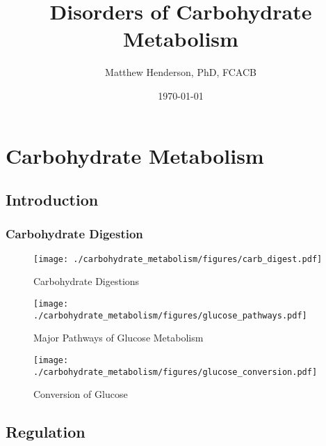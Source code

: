 \documentclass{scrartcl}
\author{Matthew Henderson, PhD, FCACB}
\date{\today}
\title{Disorders of Carbohydrate Metabolism}
\begin{document}
\maketitle
\setcounter{tocdepth}{2}
\tableofcontents


\section{Carbohydrate Metabolism}
\label{sec:orgef35f1b}
\subsection{Introduction}
\label{sec:orgfbce070}
\subsubsection{Carbohydrate Digestion}
\label{sec:org1ec764d}
\begin{figure}[htbp]
\centering
\texttt{[image: ./carbohydrate\_metabolism/figures/carb\_digest.pdf]}
\caption{\label{fig:orge9e63b0}
Carbohydrate Digestions}
\end{figure}

\begin{figure}[htbp]
\centering
\texttt{[image: ./carbohydrate\_metabolism/figures/glucose\_pathways.pdf]}
\caption{\label{fig:orgbccc81d}
Major Pathways of Glucose Metabolism}
\end{figure}

\begin{figure}[htbp]
\centering
\texttt{[image: ./carbohydrate\_metabolism/figures/glucose\_conversion.pdf]}
\caption{\label{fig:org7b51dc6}
Conversion of Glucose}
\end{figure}

\subsection{Regulation}
\label{sec:org534bf8e}
\end{document}
